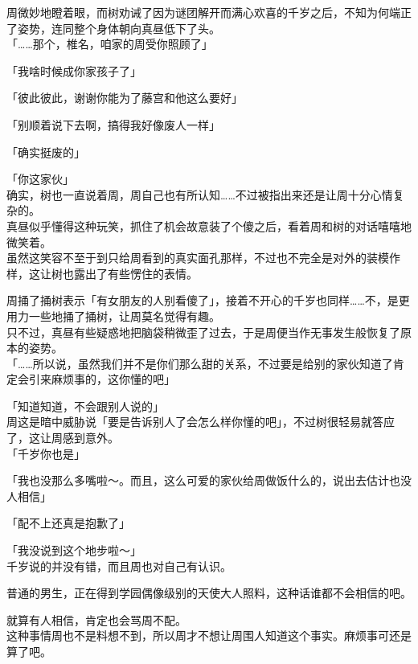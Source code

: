 周微妙地瞪着眼，而树劝诫了因为谜团解开而满心欢喜的千岁之后，不知为何端正了姿势，连同整个身体朝向真昼低下了头。\\

「……那个，椎名，咱家的周受你照顾了」

「我啥时候成你家孩子了」

「彼此彼此，谢谢你能为了藤宫和他这么要好」

「别顺着说下去啊，搞得我好像废人一样」

「确实挺废的」

「你这家伙」\\

确实，树也一直说着周，周自己也有所认知……不过被指出来还是让周十分心情复杂的。\\

真昼似乎懂得这种玩笑，抓住了机会故意装了个傻之后，看着周和树的对话嘻嘻地微笑着。\\

虽然这笑容不至于到只给周看到的真实面孔那样，不过也不完全是对外的装模作样，这让树也露出了有些愣住的表情。

周捅了捅树表示「有女朋友的人别看傻了」，接着不开心的千岁也同样……不，是更用力一些地捅了捅树，让周莫名觉得有趣。\\

只不过，真昼有些疑惑地把脑袋稍微歪了过去，于是周便当作无事发生般恢复了原本的姿势。\\

「……所以说，虽然我们并不是你们那么甜的关系，不过要是给别的家伙知道了肯定会引来麻烦事的，这你懂的吧」

「知道知道，不会跟别人说的」\\

周这是暗中威胁说「要是告诉别人了会怎么样你懂的吧」，不过树很轻易就答应了，这让周感到意外。\\

「千岁你也是」

「我也没那么多嘴啦～。而且，这么可爱的家伙给周做饭什么的，说出去估计也没人相信」

「配不上还真是抱歉了」

「我没说到这个地步啦～」\\

千岁说的并没有错，而且周也对自己有认识。

普通的男生，正在得到学园偶像级别的天使大人照料，这种话谁都不会相信的吧。

就算有人相信，肯定也会骂周不配。\\

这种事情周也不是料想不到，所以周才不想让周围人知道这个事实。麻烦事可还是算了吧。\\


